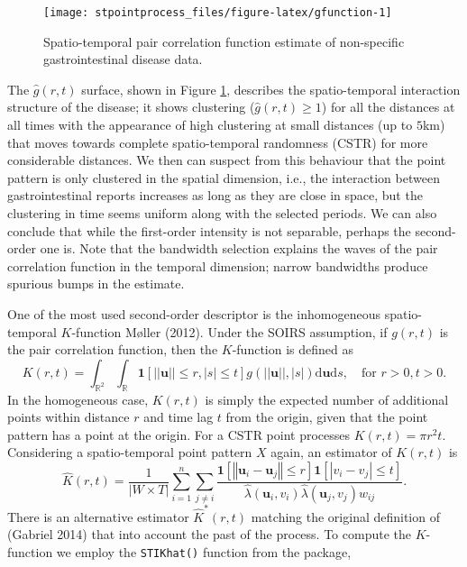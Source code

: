 \begin{figure}

{\centering \texttt{[image: stpointprocess\_files/figure-latex/gfunction-1]} 

}

\caption{Spatio-temporal pair correlation function estimate of non-specific gastrointestinal disease data.}\label{fig:gfunction}
\end{figure}

The \(\hat{g}(r,t)\) surface, shown in Figure \ref{fig:gfunction}, describes the spatio-temporal interaction structure of the disease; it shows clustering (\(\hat{g}(r,t)\geq 1\)) for all the distances at all times with the appearance of high clustering at small distances (up to \(5\)km) that moves towards complete spatio-temporal randomness (CSTR) for more considerable distances. We then can suspect from this behaviour that the point pattern is only clustered in the spatial dimension, i.e., the interaction between gastrointestinal reports increases as long as they are close in space, but the clustering in time seems uniform along with the selected periods. We can also conclude that while the first-order intensity is not separable, perhaps the second-order one is. Note that the bandwidth selection explains the waves of the pair correlation function in the temporal dimension; narrow bandwidths produce spurious bumps in the estimate.

One of the most used second-order descriptor is the inhomogeneous spatio-temporal \(K\)-function Møller (2012). Under the SOIRS assumption, if \(g(r,t)\) is the pair correlation function, then the \(K\)-function is defined as
\[
    K(r,t) = \int_{\mathbb{R}^2}\int_{\mathbb{R}} \mathbf{1}[||\mathbf{u}||\leq r, |s|\leq t] g(||\mathbf{u}||,|s|)  \text{d} \mathbf{u} \text{d} s, \quad \text{for }r>0,t>0.
\]
In the homogeneous case, \(K(r,t)\) is simply the expected number of additional points within distance \(r\) and time lag \(t\) from the origin, given that the point pattern has a point at the origin. For a CSTR point processes \(K(r,t)= \pi r^2 t\). Considering a spatio-temporal point pattern \(X\) again, an estimator of \(K(r,t)\) is
\[
    \hat{K}(r,t)= \frac{1}{|W\times T|}\sum_{i=1}^n \sum_{j\neq i}
    \frac{\mathbf{1}\left[ \left\Vert \mathbf{u}_{i}-\mathbf{u}_{j}\right\Vert \leq r\right]\mathbf{1}\left[\left\vert v_{i}-v_{j}\right\vert \leq t\right]}{\hat{\lambda} \left( \mathbf{u}_{i},v_{i}\right) \hat{\lambda} \left(\mathbf{u}_{j},v_{j}\right) w_{ij}}.
\]
There is an alternative estimator \(\hat{K}^*(r,t)\) matching the original definition of (Gabriel 2014) that into account the past of the process. To compute the \(K\)-function we employ the \texttt{STIKhat()} function from the  package,

